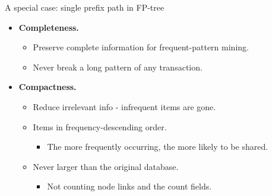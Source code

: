 \documentclass[aspectratio=169,t,xcolor=dvipsnames]{beamer}
\begin{document}
  {
    \begin{frame}{A special case: single prefix path in FP-tree}
    \centering
    \begin{itemize}
      \item \textbf{Completeness.}
      \begin{itemize}
        \item Preserve complete information for frequent-pattern mining.
        \item Never break a long pattern of any transaction.
      \end{itemize}
      \item \textbf{Compactness.}
      \begin{itemize}
        \item Reduce irrelevant info - infrequent items are gone.
        \item Items in frequency-descending order.
        \begin{itemize}
          \item The more frequently occurring, the more likely to be shared.
        \end{itemize}
        \item Never larger than the original database.
        \begin{itemize}
          \item Not counting node links and the count fields.
        \end{itemize}
      \end{itemize}
    \end{itemize}
    \end{frame}
  }
\end{document}
